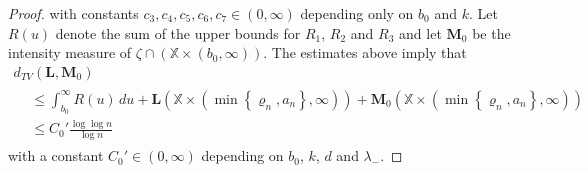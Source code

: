 \documentclass[10pt]{amsart}
\theoremstyle{definition}\newtheorem{defi}[theo]{Definition}\newtheorem{rema}[theo]{Remark}\newtheorem{exam}[theo]{Example}\newtheorem{exem}[theo]{Example}\newtheorem{nota}[theo]{Notation}
\newcommand*\bL{\mathbf{L}}
\newcommand*\bM{\mathbf{M}}
\newcommand*\X{\mathbb{X}}
\begin{document}
\begin{proof}
\noindent with constants $c_3,c_4,c_5,c_6,c_7\in(0,\infty)$ depending only on $b_0$ and $k$. Let $R(u)$ denote the sum of the upper bounds for $R_1$, $R_2$ and $R_3$ and let $\bM_0$ be the intensity measure of $\zeta\cap (\X \times (b_0,\infty))$. The estimates above imply that
\begin{multline}\label{e:dtvlmb}
d_{TV}\left(\bL, \bM_0\right)\\
\begin{aligned}
&\leq \int_{b_0}^\infty R(u) \, du + \bL\left({\X\times} \left(\min\left\{\varrho_n,a_n\right\},\infty\right)\right) + \bM_0\left({ \X\times } \left(\min\left\{\varrho_n,a_n\right\},\infty\right)\right)
\\
&\leq C_0' \frac{\log\log n}{\log n}
\end{aligned}
\end{multline}
with a constant $C_0'\in(0,\infty)$ depending on $b_0$, $k$, $d$ and $\lambda_-$.


\end{proof}
\end{document}
